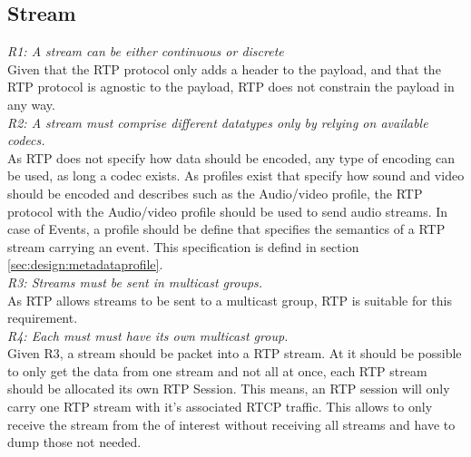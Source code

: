 


\subsection{Stream}
\textit{R1: A stream can be either continuous or discrete} \\
Given that the RTP protocol only adds a header to the payload, and that the RTP protocol is agnostic to the payload, RTP does not constrain the payload in any way.\\

\noindent\textit{R2: A stream must comprise different datatypes only by relying on available codecs.}\\
As RTP does not specify how data should be encoded, any type of encoding can be used, as long a codec exists. As profiles exist that specify how sound and video should be encoded and describes such as the Audio/video profile, the RTP protocol with the Audio/video profile should be used to send audio streams. In case of Events, a profile should be define that specifies the semantics of a RTP stream carrying an event. This specification is defind in section \ref{sec:design:metadataprofile}. \\

\noindent\textit{R3: Streams must be sent in multicast groups.}\\
As RTP allows streams to be sent to a multicast group, RTP is suitable for this requirement. \\

\noindent\textit{R4: Each must must have its own multicast group.}\\
Given R3, a stream should be packet into a RTP stream. At it should be possible to only get the data from one stream and not all at once, each RTP stream should be allocated its own RTP Session. This means, an RTP session will only carry one RTP stream with it's associated RTCP traffic. This allows  to only receive the stream from the  of interest without receiving all streams and have to dump those not needed.\\

